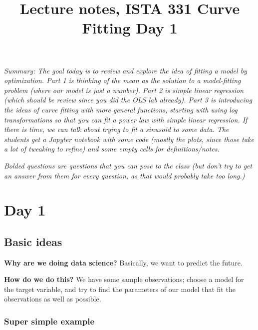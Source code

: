 \documentclass{article}
\title{Lecture notes, ISTA 331 Curve Fitting Day 1}
\begin{document}
\maketitle

\textit{Summary: The goal today is to review and explore the idea of fitting a model by optimization. Part 1 is thinking of the mean as the solution to a model-fitting problem (where our model is just a number). Part 2 is simple linear regression (which should be review since you did the OLS lab already). Part 3 is introducing the ideas of curve fitting with more general functions, starting with using log transformations so that you can fit a power law with simple linear regression. If there is time, we can talk about trying to fit a sinusoid to some data. The students get a Jupyter notebook with some code (mostly the plots, since those take a lot of tweaking to refine) and some empty cells for definitions/notes.}

\textit{Bolded questions are questions that you can pose to the class (but don't try to get an answer from them for every question, as that would probably take too long.)}

\section*{Day 1}

\subsection*{Basic ideas}

\textbf{Why are we doing data science?} Basically, we want to predict the future.

\textbf{How do we do this?} We have some sample observations; choose a model for the target variable, and try to find the parameters of our model that fit the observations as well as possible.

\subsubsection*{Super simple example}
\end{document}
